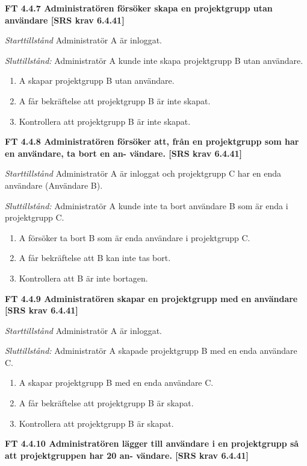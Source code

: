 \documentclass[a4paper]{article}
\begin{document}
\textbf{FT 4.4.7 Administratören försöker skapa en projektgrupp utan användare [SRS krav 6.4.41]}

\emph{Starttillstånd} Administratör A är inloggat.

\emph{Sluttillstånd:} Administratör A kunde inte skapa  projektgrupp B utan användare.

\begin{enumerate}
\item A skapar projektgrupp B utan användare.
\item A får bekräftelse att projektgrupp B är inte skapat.
\item Kontrollera att projektgrupp B är inte skapat.
\end{enumerate}

\textbf{FT 4.4.8 Administratören försöker att, från en projektgrupp som har en användare, ta bort en an- vändare. [SRS krav 6.4.41]}

\emph{Starttillstånd} Administratör A är inloggat och projektgrupp C har en enda användare (Användare B).

\emph{Sluttillstånd:} Administratör A kunde inte ta bort användare B som är enda i  projektgrupp C.

\begin{enumerate}
\item A försöker ta bort B som är enda användare i projektgrupp C.
\item A får bekräftelse att B kan inte tas bort.
\item Kontrollera att B är inte bortagen.
\end{enumerate}

\textbf{FT 4.4.9 Administratören skapar en projektgrupp med en användare [SRS krav 6.4.41]}

\emph{Starttillstånd} Administratör A är inloggat. 

\emph{Sluttillstånd:} Administratör A  skapade  projektgrupp B med en enda användare C.

\begin{enumerate}
\item A skapar projektgrupp B med en enda användare C.
\item A får bekräftelse att projektgrupp B är skapat.
\item Kontrollera att projektgrupp B är skapat.
\end{enumerate}

\textbf{FT 4.4.10 Administratören lägger till användare i en projektgrupp så att projektgruppen har 20 an- vändare. [SRS krav 6.4.41]}
\end{document}
